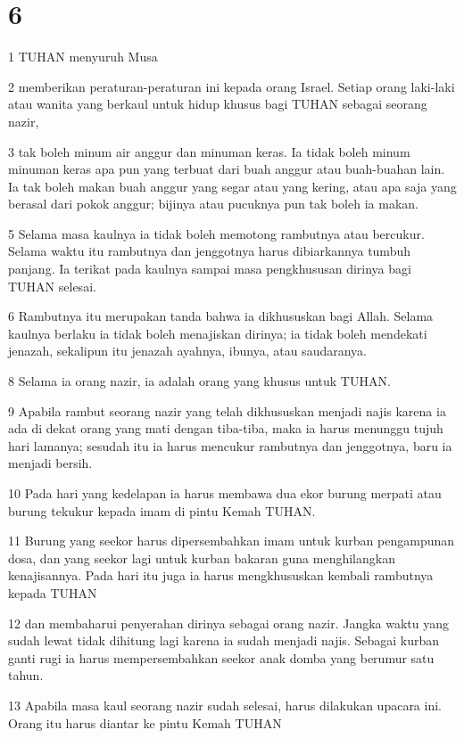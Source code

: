 \chapter{6}

\par 1 TUHAN menyuruh Musa
\par 2 memberikan peraturan-peraturan ini kepada orang Israel. Setiap orang laki-laki atau wanita yang berkaul untuk hidup khusus bagi TUHAN sebagai seorang nazir,
\par 3 tak boleh minum air anggur dan minuman keras. Ia tidak boleh minum minuman keras apa pun yang terbuat dari buah anggur atau buah-buahan lain. Ia tak boleh makan buah anggur yang segar atau yang kering, atau apa saja yang berasal dari pokok anggur; bijinya atau pucuknya pun tak boleh ia makan.
\par 5 Selama masa kaulnya ia tidak boleh memotong rambutnya atau bercukur. Selama waktu itu rambutnya dan jenggotnya harus dibiarkannya tumbuh panjang. Ia terikat pada kaulnya sampai masa pengkhususan dirinya bagi TUHAN selesai.
\par 6 Rambutnya itu merupakan tanda bahwa ia dikhususkan bagi Allah. Selama kaulnya berlaku ia tidak boleh menajiskan dirinya; ia tidak boleh mendekati jenazah, sekalipun itu jenazah ayahnya, ibunya, atau saudaranya.
\par 8 Selama ia orang nazir, ia adalah orang yang khusus untuk TUHAN.
\par 9 Apabila rambut seorang nazir yang telah dikhususkan menjadi najis karena ia ada di dekat orang yang mati dengan tiba-tiba, maka ia harus menunggu tujuh hari lamanya; sesudah itu ia harus mencukur rambutnya dan jenggotnya, baru ia menjadi bersih.
\par 10 Pada hari yang kedelapan ia harus membawa dua ekor burung merpati atau burung tekukur kepada imam di pintu Kemah TUHAN.
\par 11 Burung yang seekor harus dipersembahkan imam untuk kurban pengampunan dosa, dan yang seekor lagi untuk kurban bakaran guna menghilangkan kenajisannya. Pada hari itu juga ia harus mengkhususkan kembali rambutnya kepada TUHAN
\par 12 dan membaharui penyerahan dirinya sebagai orang nazir. Jangka waktu yang sudah lewat tidak dihitung lagi karena ia sudah menjadi najis. Sebagai kurban ganti rugi ia harus mempersembahkan seekor anak domba yang berumur satu tahun.
\par 13 Apabila masa kaul seorang nazir sudah selesai, harus dilakukan upacara ini. Orang itu harus diantar ke pintu Kemah TUHAN
